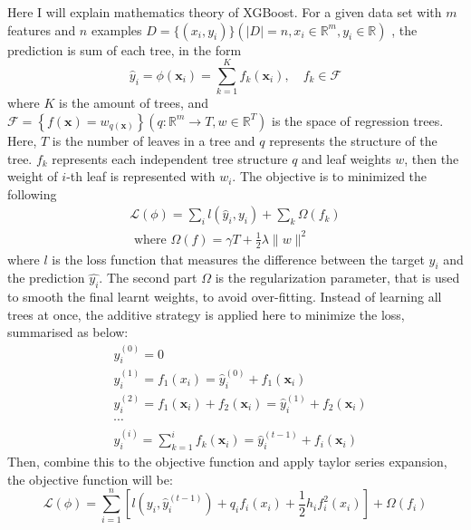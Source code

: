 \documentclass[12pt,a4paper,english
]{tunithesis}
\begin{document}
Here I will explain mathematics theory of XGBoost. For a given data set with $m$ features and $n$ examples $D = \{(x_i, y_i)\}(|D|=n, x_i \in \mathbb{R}^m, y_i \in \mathbb{R})$ , the prediction is sum of each tree, in the form
\begin{equation}
    \hat{y}_i=\phi\left(\mathbf{x}_i\right)=\sum_{k=1}^K f_k\left(\mathbf{x}_i\right), \quad f_k \in \mathcal{F}
\end{equation}
where $K$ is the amount of trees, and $\mathcal{F}=\left\{f(\mathbf{x})=w_{q(\mathbf{x})}\right\}\left(q: \mathbb{R}^m \rightarrow T, w \in \mathbb{R}^T\right)$ is the space of regression trees. Here, $T$ is the number of leaves in a tree and $q$ represents the structure of the tree. $f_k$ represents each independent tree structure $q$ and leaf weights $w$, then the weight of $i$-th leaf is represented with $w_i$. The objective is to minimized the following
\begin{equation}
    \begin{gathered}
\mathcal{L}(\phi)=\sum_i l\left(\hat{y}_i, y_i\right)+\sum_k \Omega\left(f_k\right) \\
\text { where } \Omega(f)=\gamma T+\frac{1}{2} \lambda\|w\|^2
\end{gathered}
\end{equation}
where $l$ is the loss function that measures the difference between the target $y_i$ and the prediction $\hat{y_i}$. The second part $\Omega$ is the regularization parameter, that is used to smooth the final learnt weights, to avoid over-fitting. Instead of learning all trees at once, the additive strategy is applied here to minimize the loss, summarised as below:
\begin{equation}
    \begin{aligned}
& \hat{y}_i^{(0)}=0 \\
& \hat{y}_i^{(1)}=f_1\left(x_i\right)=\hat{y}_i^{(0)}+f_1\left(\mathbf{x}_i\right) \\
& \hat{y}_i^{(2)}=f_1\left(\mathbf{x}_i\right)+f_2\left(\mathbf{x}_i\right)=\hat{y}_i^{(1)}+f_2\left(\mathbf{x}_i\right) \\
& \cdots \\
& \hat{y}_i^{(i)}=\sum_{k=1}^i f_k\left(\mathbf{x}_i\right)=\hat{y}_i^{(t-1)}+f_i\left(\mathbf{x}_i\right)
\end{aligned}
\end{equation}
Then, combine this to the objective function and apply taylor series expansion, the objective function will be:
\begin{equation}
    \mathcal{L}(\phi)=\sum_{i=1}^n\left[l\left(y_i, \hat{y}_i^{(t-1)}\right)+q_i f_i\left(x_i\right)+\frac{1}{2} h_i f_i^2\left(x_i\right)\right]+\Omega\left(f_i\right)
\end{equation}
\end{document}
